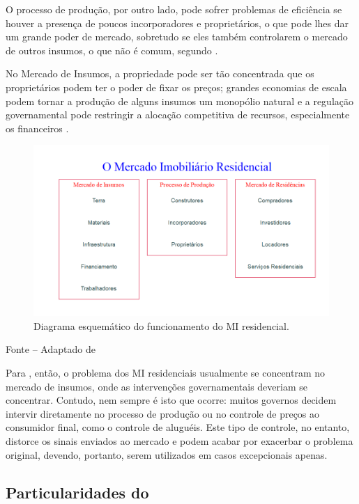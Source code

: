 \documentclass[
	12pt,				%
	oneside,			%
	a4paper,			%
	chapter=TITLE,		%
	section=TITLE,		%
	english,			%
	brazil				%
	]{abntex2}
\newcommand{\bcenter}{\begin{center}}
\newcommand{\ecenter}{\end{center}}
\begin{document}
\begin{refsection}
O processo de produção, por outro lado, pode sofrer problemas de eficiência se
houver a presença de poucos incorporadores e proprietários, o que pode lhes dar
um grande poder de mercado, sobretudo se eles também controlarem o mercado de
outros insumos, o que não é comum, segundo \textcite[p.~189]{shelter}.

No Mercado de Insumos, a propriedade pode ser tão concentrada que os
proprietários podem ter o poder de fixar os preços; grandes economias de escala
podem tornar a produção de alguns insumos um monopólio natural e a regulação
governamental pode restringir a alocação competitiva de recursos, especialmente
os financeiros \autocite[p.~189]{shelter}.
\begin{figure}[H]

{\centering \includegraphics[width=0.7\linewidth]{images/MIResidencial-1} 

}

\caption{Diagrama esquemático do funcionamento do \gls{MI} residencial.}\label{fig:MIResidencial}
\end{figure}
\bcenter

\small Fonte -- Adaptado de \textcite[p.~189]{shelter}
\ecenter

Para \textcite[p.~189]{shelter}, então, o problema dos \gls{MI} residenciais usualmente
se concentram no mercado de insumos, onde as intervenções governamentais
deveriam se concentrar. Contudo, nem sempre é isto que ocorre: muitos governos
decidem intervir diretamente no processo de produção ou no controle de preços ao
consumidor final, como o controle de aluguéis. Este tipo de controle, no
entanto, distorce os sinais enviados ao mercado e podem acabar por exacerbar o
problema original, devendo, portanto, serem utilizados em casos excepcionais
apenas.

\hypertarget{particularidades-do}{%
\subsection{\texorpdfstring{Particularidades do }{Particularidades do }}\label{particularidades-do}}


\end{refsection}
\end{document}
